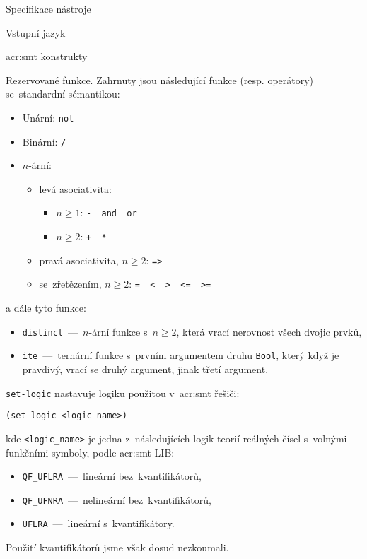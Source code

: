 \documentclass[thesis=M,czech]{FITthesis}[2012/06/26]
\newcommand{\acrlabel}[1]{acr:#1}
\newcommand{\acr}[1]{\acrshort{\acrlabel{#1}}}
\newcommand{\id}[1]{\texttt{#1}}
\begin{document}
\begin{section}{Specifikace nástroje}
\begin{subsection}{Vstupní jazyk}
\begin{subsubsection}{\acr{smt} konstrukty}

\begin{paragraph}{Rezervované funkce.}\label{p:design:spec:ilang:smt:reserved}
Zahrnuty jsou následující funkce (resp. operátory)
se~standardní sémantikou:
\begin{itemize}
\item Unární:  \quad \id{not}
\item Binární: \quad \id{/}
\item $n$-ární:
   \begin{itemize}
   \item levá asociativita:
      \begin{itemize}
      \item ${n \geq 1}$: \quad \id{- \ and \  or}
      \item ${n \geq 2}$: \quad \id{+ \  *}
      \end{itemize}
   \item pravá asociativita, ${n \geq 2}$: \quad \id{=>}
   \item se~zřetězením, ${n \geq 2}$:  \quad \id{= \  < \  > \  <= \  >=}
   \end{itemize}
\end{itemize}
a dále tyto funkce:
\begin{itemize}
\item \id{distinct}~---~$n$-ární funkce s~${n \geq 2}$,
   která vrací nerovnost všech dvojic prvků,
\item \id{ite}~---~ternární funkce s~prvním argumentem druhu \id{Bool},
   který když je pravdivý,
   vrací se druhý argument, jinak třetí argument.
\end{itemize}
\end{paragraph} %


\begin{paragraph}{\id{set-logic}}\label{p:design:spec:ilang:smt:logic}
nastavuje logiku použitou v~\acr{smt} řešiči:
\begin{center}
\id{(set-logic <logic\_\-name>)}
\end{center}
kde \id{<logic\_\-name>} je jedna z~následujících logik
teorií reálných čísel s~volnými funkčními symboly,
podle \acr{smt}-LIB:
\begin{itemize}
\item \id{QF\_\-UFLRA}~---~lineární bez~kvantifikátorů,
\item \id{QF\_\-UFNRA}~---~nelineární bez~kvantifikátorů,
\item \id{UFLRA}~---~lineární s~kvantifikátory.
\end{itemize}
Použití kvantifikátorů jsme však dosud nezkoumali.


\end{paragraph}
\end{subsubsection}
\end{subsection}
\end{section}
\end{document}
